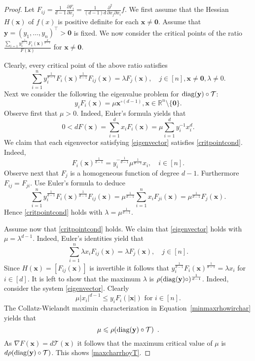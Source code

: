 \documentclass{amsart}
\newcommand{\diag}{\operatorname{diag}}
\newcommand{\R}{\mathbb{R}}
\newcommand{\x}{\mathbf{x}}
\newcommand{\y}{\mathbf{y}}
\newcommand{\0}{\mathbf{0}}
\newcommand{\1}{\mathbf{1}}
\newcommand{\cT}{\mathcal{T}}
\def\diag{\mathop{{\rm diag}}\nolimits}
\newcommand{\trans}{^\top}
\theoremstyle{remark}
\numberwithin{equation}{section} %
\renewcommand{\le}{\leqslant}
\begin{document}
\begin{proof}
  {{Let $F_{ij}=\frac{1}{d-1}\frac{\partial F_i}{\partial x_j}=\frac{1}{(d-1)d}\frac{\partial ^2\;\;\;\;\;\;}{\partial x_j\partial x_i}f$.}}
We first assume that the Hessian $H(\x)$ of $f(x)$ is positive definite for each $\x\ne \0$.  Assume that $\y=(y_1,\ldots,y_n)\trans>\0$ is fixed.
We now consider the critical points of the ratio
$\frac{\sum_{i=1} y_i^{\frac{1}{d-1}}F_i(\x)^{\frac{d}{d-1}}}{F(\x)}$ for $\x\ne \0$.

Clearly, every critical point of the above ratio satisfies
 \begin{equation}\label{critpointcond}
 \sum_{i=1}^n y_i^{\frac{1}{d-1}} F_i(\x)^{\frac{1}{d-1}}F_{ij}(\x)=\lambda F_j(\x), \quad j\in [n], \x\ne \0,\lambda\ne 0.
 \end{equation}
Next we consider the following the eigenvalue problem for $\diag(\y)\circ\cT$:
 \begin{equation}\label{eigenvector}
 y_iF_i(\x)=\mu \x^{\circ(d-1)}, \x\in\R^n\setminus\{\0\}.
 \end{equation}  
 Observe first that $\mu>0$. Indeed, Euler's formula yields that 
 \[0<dF(\x)=\sum_{i=1}^d x_i F_i(\x)=\mu \sum_{i=1}^d y_i^{-1}x_i^d.\] 
 We claim that each eigenvector satisfying \eqref{eigenvector} satisfies \eqref{critpointcond}.
 Indeed, 
 \[F_i(\x)^{\frac{1}{d-1}}= y_i^{-\frac{1}{d-1}}\mu^{\frac{1}{d-1}}x_i, \quad i\in[n].\]
 Observe next that $F_j$ is a homogeneous function of degree $d-1$.  Furthermore $F_{ij}=F_{ji}$.
 Use Euler's formula to deduce
 \[ \sum_{i=1}^n y_i^{\frac{1}{d-1}} F_i(\x)^{\frac{1}{d-1}}F_{ij}(\x)=\mu^{\frac{1}{d-1}}\sum_{i=1}^n x_iF_{ji}(\x)=\mu^{\frac{1}{d-1}}F_j(\x).\]
 Hence \eqref{critpointcond} holds with $\lambda=\mu^{\frac{1}{d-1}}$.
 
 Assume now that \eqref{critpointcond} holds.  We claim that \eqref{eigenvector} holds with $\mu=\lambda^{d-1}$.
 Indeed, Euler's identities yield that
 \[\sum_{i=1}^n \lambda x_i F_{ij}(\x)=\lambda F_j(\x), \quad j\in[n].\]
 Since $H(\x)=[F_{ij}(\x)]$ is invertible it follows that  $y_i^{\frac{1}{d-1}} F_i(\x)^{\frac{1}{d-1}}=\lambda x_i$ for $i\in[d]$.
 It is left to show that the maximum $\lambda$ is $\rho(\diag(\y)\circ)^{\frac{1}{d-1}}$.  Indeed, consider the system \eqref {eigenvector}.
 Clearly
 \[\mu |x_i|^{d-1}\le y_i F_i(|\x|) \textrm{ for } i\in [n].\]
%
The Collatz-Wielandt maximin characterization in Equation~\eqref{minmaxrhowirchar} yields that 
\[ 
\mu\le \rho(\diag(\y)\circ\cT) \enspace .
\]
 As $\nabla F(\x)=d\cT(\x)$ it follows that the maximum critical value of $\mu$ is $d\rho(\diag(\y)\circ \cT)$.  This shows \eqref{maxcharrhoyT}.
 

\end{proof}
\end{document}
